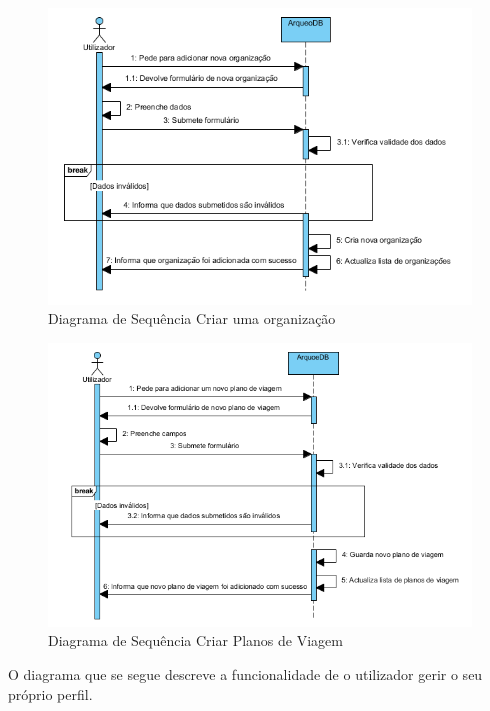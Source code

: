 \documentclass[12pt,a4paper]{article}
\begin{document}
\begin{figure}[h!]
\centering
\includegraphics[scale=0.8]{sequencia/criarorganizacao}
\caption{Diagrama de Sequência Criar uma organização} 
\end{figure}

\begin{figure}[h!]
\centering
\includegraphics[scale=0.8]{sequencia/criarviagem}
\caption{Diagrama de Sequência Criar Planos de Viagem} 
\end{figure}

\clearpage
O diagrama que se segue descreve a funcionalidade de o utilizador gerir o seu próprio perfil.\\
\end{document}
